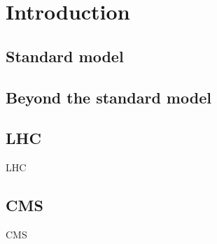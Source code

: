 \chapter{Introduction}


\section{Standard model}


\section{Beyond the standard model}


\section{LHC}


LHC~\cite{LHC:Evans1129806}



\section{CMS}

CMS~\cite{CMS:Chatrchyan2008zzk,CMS:PTDR2}




